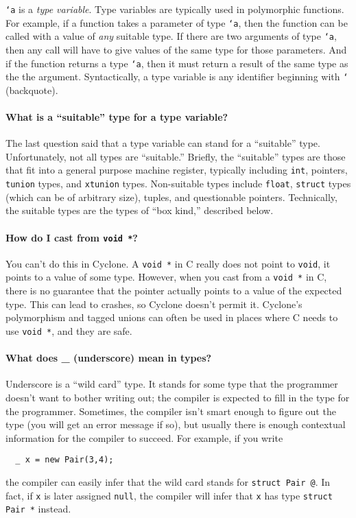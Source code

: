 \texttt{`a} is a \emph{type variable}.  Type variables are typically
used in polymorphic functions.  For example, if a function takes a
parameter of type \texttt{`a}, then the function can be called with a
value of \emph{any} suitable type.  If there are two arguments of type
\texttt{`a}, then any call will have to give values of the same type
for those parameters.  And if the function returns a type \texttt{`a},
then it must return a result of the same type as the the argument.
Syntactically, a type variable is any identifier beginning with
\texttt{`} (backquote).

\paragraph{What is a ``suitable'' type for a type variable?}

The last question said that a type variable can stand for a
``suitable'' type.  Unfortunately, not all types are ``suitable.''
Briefly, the ``suitable'' types are those that fit into a general
purpose machine register, typically including \texttt{int}, pointers,
\texttt{tunion} types, and \texttt{xtunion} types.  Non-suitable types
include \texttt{float}, \texttt{struct} types (which can be of
arbitrary size), tuples, and questionable pointers.
Technically, the suitable types are the types of ``box kind,''
described below.

\paragraph{How do I cast from \texttt{void *}?}

You can't do this in Cyclone.  A \texttt{void *} in C really does not
point to \texttt{void}, it points to a value of some type.  However,
when you cast from a \texttt{void *} in C, there is no guarantee that
the pointer actually points to a value of the expected type.  This can
lead to crashes, so Cyclone doesn't permit it.  Cyclone's
polymorphism and tagged unions can often be used in places where C
needs to use \texttt{void *}, and they are safe.

\paragraph{What does _ (underscore) mean in types?}

Underscore is a ``wild card'' type.  It stands for some type that the
programmer doesn't want to bother writing out; the compiler is
expected to fill in the type for the programmer.  Sometimes, the
compiler isn't smart enough to figure out the type (you will get an
error message if so), but usually there is enough contextual
information for the compiler to succeed.  For example, if you write
\begin{verbatim}
  _ x = new Pair(3,4);
\end{verbatim}
the compiler can easily infer that the wild card stands for
\texttt{struct Pair @}.  In fact, if \texttt{x} is later assigned
\texttt{null}, the compiler will infer that \texttt{x} has type
\texttt{struct Pair *} instead.

